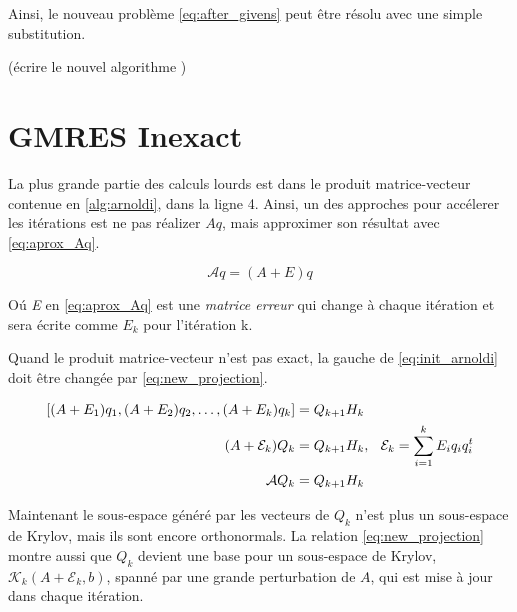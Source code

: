     Ainsi, le nouveau problème \ref{eq:after_givens} peut être résolu avec une simple substitution.

    (écrire le nouvel algorithme )

    \section{GMRES Inexact}

    La plus grande partie des calculs lourds est dans le produit matrice-vecteur contenue en \ref{alg:arnoldi}, dans la ligne 4. Ainsi, un des approches pour accélerer les itérations est ne pas réalizer $Aq $, mais approximer son résultat avec \ref{eq:aprox_Aq}.

    \begin{equation}\label{eq:aprox_Aq}
        \mathcal{A}q = (A + E)q
    \end{equation}
    
    Oú \textit{E} en \ref{eq:aprox_Aq} est une \textit{matrice erreur} qui change à chaque itération et sera écrite comme $E_{k}$ pour l'itération k.

    Quand le produit matrice-vecteur n'est pas exact, la gauche de \ref{eq:init_arnoldi} doit être changée par \ref{eq:new_projection}.


    \begin{align} \label{eq:new_projection}
    \begin{split}
        [(A + E_{1})q_{1}, (A + E_{2})q_{2},\dots, (A + E_{k})q_{k}] &= Q_{k+1}H_{k}\\ 
        (A + \mathcal{E}_{k})Q_{k} &= Q_{k+1}H_{k}, \hspace{0.1in} \mathcal{E}_{k} = \sum_{i=1}^{k}E_{i}q_{i}q_{i}^{t}\\
        \mathcal{A}Q_{k} &= Q_{k+1}H_{k}
    \end{split}
    \end{align}


    Maintenant le sous-espace généré par les vecteurs de $Q_{k}$ n'est plus un sous-espace de Krylov, mais ils sont encore orthonormals.
    La relation \ref{eq:new_projection} montre aussi que $Q_{k}$ devient une base pour un sous-espace de Krylov, $\mathcal{K}_{k}(A+\mathcal{E}_{k},b)$, spanné par une grande perturbation de $A$, qui est mise à jour dans chaque itération.
    
